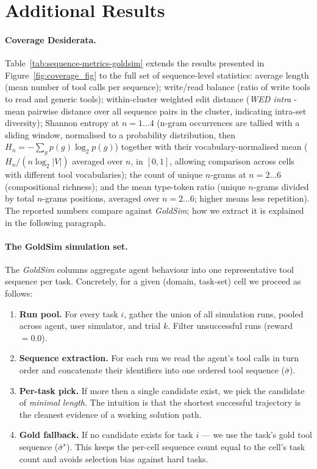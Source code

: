\section{Additional Results}
\label{app:additional-results}

\paragraph{Coverage Desiderata.}
\label{app:sequence-metrics-full}

Table~\ref{tab:sequence-metrics-goldsim} extends the results presented in Figure~\ref{fig:coverage_fig} to the full set of sequence-level statistics: average length (mean number of tool calls per sequence); write/read balance (ratio of write tools to read and generic tools); within-cluster weighted edit distance (\emph{WED intra} - mean pairwise distance over all sequence pairs in the cluster, indicating intra-set diversity); Shannon entropy at \mbox{$n=1\ldots4$} (n-gram occurrences are tallied with a sliding window, normalised to a probability distribution, then $H_n=-\sum_g p(g)\log_2 p(g)$) together with their vocabulary-normalised mean ($H_n/(n\log_2|V|)$ averaged   over $n$, in $[0,1]$, allowing comparison across cells with different tool vocabularies); the count of unique $n$-grams at $n=2\ldots6$ (compositional richness); and the mean type-token ratio (unique $n$-grams divided by total $n$-grams positions, averaged over $n=2\ldots6$; higher means less repetition). The reported numbers compare against \emph{GoldSim}; how we extract it is explained in the following paragraph.

\paragraph{The GoldSim simulation set.}
The \emph{GoldSim} columns aggregate agent behaviour into one representative tool sequence per task. Concretely, for a given (domain, task-set) cell we proceed as follows:
\begin{enumerate}
    \item \textbf{Run pool.} For every task $i$, gather the union of all simulation runs, pooled across agent, user simulator, and trial $k$. Filter unsuccessful runs (reward$=0.0$).
    \item \textbf{Sequence extraction.} For each run we read the agent's tool calls in turn order and concatenate their identifiers into one ordered tool sequence ($\bar\sigma$).
    \item \textbf{Per-task pick.} If more then a single candidate exist, we pick the candidate of \emph{minimal length}. The intuition is that the shortest successful trajectory is the cleanest evidence of a working solution path.
    \item \textbf{Gold fallback.} If no candidate exists for task $i$ ---  we use the task's gold tool sequence ($\bar\sigma^\star$). This keeps the per-cell sequence count equal to the cell's task count and avoids selection bias against hard tasks.
\end{enumerate}

